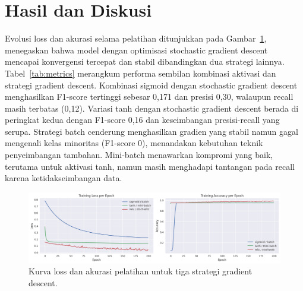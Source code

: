 \documentclass[12pt]{article}
\begin{document}
\section*{Hasil dan Diskusi}
Evolusi loss dan akurasi selama pelatihan ditunjukkan pada Gambar~\ref{fig:loss-accuracy}, menegaskan bahwa model dengan optimisasi stochastic gradient descent mencapai konvergensi tercepat dan stabil dibandingkan dua strategi lainnya. Tabel~\ref{tab:metrics} merangkum performa sembilan kombinasi aktivasi dan strategi gradient descent. Kombinasi sigmoid dengan stochastic gradient descent menghasilkan F1-score tertinggi sebesar 0,171 dan presisi 0,30, walaupun recall masih terbatas (0,12). Variasi tanh dengan stochastic gradient descent berada di peringkat kedua dengan F1-score 0,16 dan keseimbangan presisi-recall yang serupa. Strategi batch cenderung menghasilkan gradien yang stabil namun gagal mengenali kelas minoritas (F1-score 0), menandakan kebutuhan teknik penyeimbangan tambahan. Mini-batch menawarkan kompromi yang baik, terutama untuk aktivasi tanh, namun masih menghadapi tantangan pada recall karena ketidakseimbangan data.

\begin{figure}[htbp]
    \centering
    \includegraphics[width=1\textwidth]{loss-and-traning-accuracy.png}
    \caption{Kurva loss dan akurasi pelatihan untuk tiga strategi gradient descent.}
    \label{fig:loss-accuracy}
\end{figure}
\end{document}
